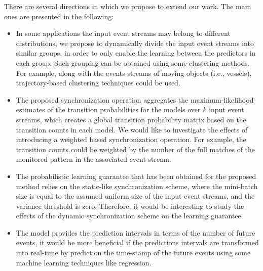 There are several directions in which we propose to extend our work. The main ones are presented in the following:

\begin{itemize}[noitemsep]
	
\item In some applications the input event streams may belong to different distributions, we propose to dynamically divide the input event streams into similar groups, in order to only enable the learning between the predictors in each group.  Such grouping can be obtained using some clustering methods. For example, along with the events streams of moving objects (i.e., vessels), trajectory-based clustering techniques \cite{lee2007trajectory,liu2014knowledge} could be used.
 
\item  The proposed synchronization operation aggregates the maximum-likelihood estimates of the transition probabilities for the \pmcmr models over $k$ input event streams, which creates a global transition probability matrix based on the transition counts in each model. We would like to investigate the effects of introducing a weighted based synchronization operation. For example, the transition counts could be weighted by the number of the full matches of the monitored pattern in the associated event stream. 

\item The probabilistic learning guarantee that has been obtained for the proposed method relies on the static-like synchronization scheme, where the mini-batch size is equal to the assumed uniform size of the input event streams, and the variance threshold is zero. Therefore, it would be interesting to study the effects of the dynamic synchronization scheme on the learning guarantee.

\item The \pmcmr model provides the prediction intervals in terms of the number of future events, it would be more beneficial if the predictions intervals are transformed into real-time by prediction the time-stamp of the future events using some machine learning techniques like regression.  


\end{itemize}

